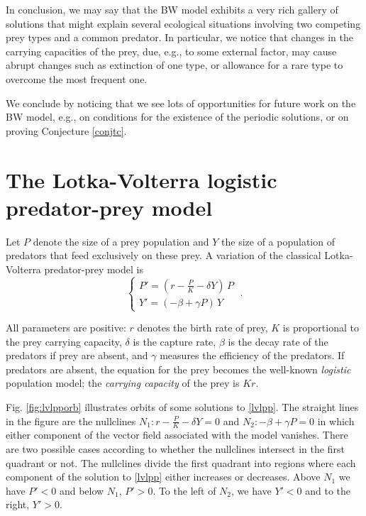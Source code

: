 \documentclass[12pt]{article}
\theoremstyle{definition}
\begin{document}
In conclusion, we may say that the BW model exhibits a very rich gallery of solutions that might explain several ecological situations involving two competing prey types and a common predator. In particular, we notice that changes in the carrying capacities of the prey, due, e.g., to some external factor, may cause abrupt changes such as extinction of one type, or allowance for a rare type to overcome the most frequent one.

We conclude by noticing that we see lots of opportunities for future work on the BW model, e.g., on conditions for the existence of the periodic solutions, or on proving Conjecture \ref{conjtc}.




\appendix
\section{The Lotka-Volterra logistic predator-prey model}\label{app:lvlpp}
Let $P$ denote the size of a prey population and $Y$ the size of a population of predators that feed exclusively on these prey. A variation of the classical Lotka-Volterra predator-prey model \cite{hofsig, edel, murray} is
\begin{equation} \label{lvlpp}
	\begin{cases} 
		P' = (r - \frac{P}{K} - \delta Y)\, P\\
		Y' = ( -\beta + \gamma P) \,Y
	\end{cases}\;.
\end{equation}

All parameters are positive: $r$ denotes the birth rate of prey, $K$ is proportional to the prey carrying capacity, $\delta$ is the capture rate, $\beta$ is the decay rate of the predators if prey are absent, and $\gamma$ measures the efficiency of the predators. If predators are absent, the equation for the prey becomes the well-known \emph{logistic} population model; the \emph{carrying capacity} of the prey is $Kr$.

Fig. \ref{fig:lvlpporb} illustrates orbits of some solutions to \eqref{lvlpp}. The straight lines in the figure are the nullclines $N_1: r - \frac{P}{K} - \delta Y=0$ and $N_2: -\beta + \gamma P=0$ in which either component of the vector field associated with the model vanishes. There are two possible cases according to whether the nullclines intersect in the first quadrant or not. The nullclines divide the first quadrant into regions where each component of the solution to \eqref{lvlpp} either increases or decreases. Above $N_1$ we have $P'<0$ and below $N_1$, $P'>0$. To the left of $N_2$, we have $Y'<0$ and to the right, $Y'>0$.
\end{document}
